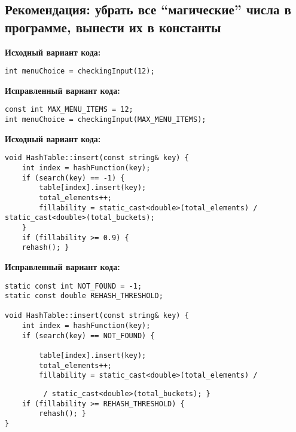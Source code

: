 \documentclass[11pt,a4paper,final]{article} %
\begin{document}
\subsection{Рекомендация: убрать все ``магические'' числа в программе, вынести их в константы}

\begin{minipage}[t]{0.48\textwidth}
\textbf{Исходный вариант кода:}
\begin{lstlisting}
int menuChoice = checkingInput(12);
\end{lstlisting}
\end{minipage}
\hfill %
\begin{minipage}[t]{0.48\textwidth}
\textbf{Исправленный вариант кода:}
\begin{lstlisting}
const int MAX_MENU_ITEMS = 12;
int menuChoice = checkingInput(MAX_MENU_ITEMS);
\end{lstlisting}
\end{minipage}

\begin{minipage}[t]{0.48\textwidth}
\textbf{Исходный вариант кода:}
\begin{lstlisting}
void HashTable::insert(const string& key) {
	int index = hashFunction(key);
	if (search(key) == -1) {
		table[index].insert(key);
		total_elements++;
		fillability = static_cast<double>(total_elements) / static_cast<double>(total_buckets);
	}
	if (fillability >= 0.9) {
	rehash(); }
\end{lstlisting}
\end{minipage}
\hfill %
\begin{minipage}[t]{0.48\textwidth}
\textbf{Исправленный вариант кода:}
\begin{lstlisting}
static const int NOT_FOUND = -1;
static const double REHASH_THRESHOLD;

void HashTable::insert(const string& key) {
	int index = hashFunction(key);
	if (search(key) == NOT_FOUND) {
		
		table[index].insert(key);
		total_elements++;
		fillability = static_cast<double>(total_elements) /
\end{lstlisting}
\end{minipage}


\newpage 
\hfill
\begin{minipage}[t]{0.48\textwidth}
\begin{lstlisting}	
		 / static_cast<double>(total_buckets); }
	if (fillability >= REHASH_THRESHOLD) {
		rehash(); }
}
\end{lstlisting}
\end{minipage}
\end{document}
